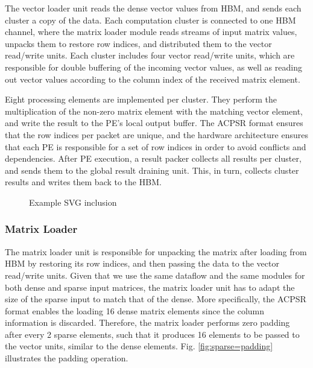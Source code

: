 \documentclass[manuscript,screen,review]{acmart}
\begin{document}
The vector loader unit reads the dense vector values from HBM, and sends each cluster a copy of the data. Each computation cluster is connected to one HBM channel, where the matrix loader module reads streams of input matrix values, unpacks them to restore row indices, and distributed them to the vector read/write units. Each cluster includes four vector read/write units, which are responsible for double buffering of the incoming vector values, as well as reading out vector values according to the column index of the received matrix element. 

Eight processing elements are implemented per cluster. They perform the multiplication of the non-zero matrix element with the matching vector element, and write the result to the PE's local output buffer. The ACPSR format ensures that the row indices per packet are unique, and the hardware architecture ensures that each PE is responsible for a set of row indices in order to avoid conflicts and dependencies. After PE execution, a result packer collects all results per cluster, and sends them to the global result draining unit. This, in turn, collects cluster results and writes them back to the HBM.






\begin{figure}[h]
	\centering
	
	\caption{Example SVG inclusion}
	\label{fig:architecture}
\end{figure}

\subsubsection{Matrix Loader}
The matrix loader unit is responsible for unpacking the matrix after loading from HBM by restoring its row indices, and then passing the data to the vector read/write units. Given that we use the same dataflow and the same modules for both dense and sparse input matrices,  the matrix loader unit has to adapt the size of the sparse input to match that of the dense. More specifically, the ACPSR format enables the loading 16 dense matrix elements since the column information is discarded. Therefore, the matrix loader performs zero padding after every 2 sparse elements, such that it produces 16 elements to be passed to the vector units, similar to the dense elements. Fig. \ref{fig:sparse=padding} illustrates the padding operation.
\end{document}
